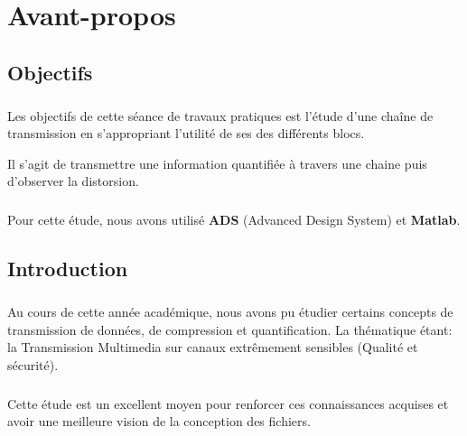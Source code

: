 \chapter*{Avant-propos}
\minitoc


\section*{Objectifs}
\paragraph{}
Les objectifs de cette séance de travaux pratiques est l'étude d'une chaîne de transmission en s'appropriant l'utilité de ses des différents blocs.

Il s'agit de transmettre une information quantifiée à travers une chaine puis d'observer la distorsion.
\paragraph{}
Pour cette étude, nous avons utilisé \textbf{ADS} (Advanced Design System) et \textbf{Matlab}.


\section*{Introduction}
\paragraph{}

Au cours de cette année académique, nous avons pu étudier certains concepts de transmission de données, de compression et quantification. La thématique étant: la Transmission Multimedia sur canaux extrêmement sensibles (Qualité et sécurité).

\paragraph{}
 Cette étude est un excellent moyen pour renforcer ces connaissances acquises et avoir une meilleure vision de la conception des fichiers.
